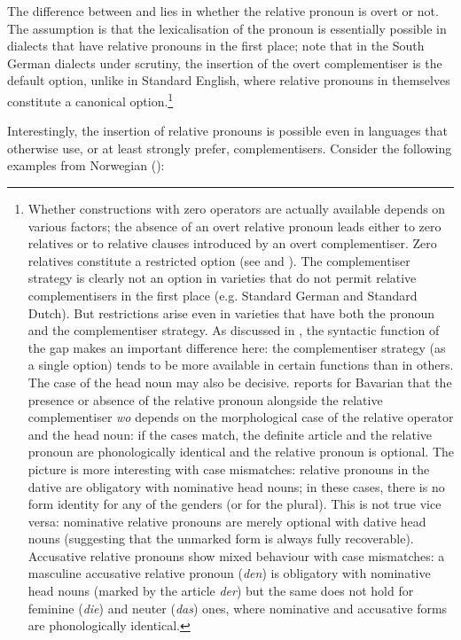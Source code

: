 The difference between  and  lies in whether the relative pronoun is overt or not. The assumption is that the lexicalisation of the pronoun is essentially possible in dialects that have relative pronouns in the first place; note that in the South German dialects under scrutiny, the insertion of the overt complementiser is the default option, unlike in Standard English, where relative pronouns in themselves constitute a canonical option.\footnote{Whether constructions with zero operators are actually available depends on various factors; the absence of an overt relative pronoun leads either to zero relatives or to relative clauses introduced by an overt complementiser. Zero relatives constitute a restricted option (see  and ). The complementiser strategy is clearly not an option in varieties that do not permit relative complementisers in the first place (e.g. Standard German and Standard Dutch). But restrictions arise even in varieties that have both the pronoun and the complementiser strategy. As discussed in , the syntactic function of the gap makes an important difference here: the complementiser strategy (as a single option) tends to be more available in certain functions than in others. The case of the head noun may also be decisive. \citet[215--217, 221--222]{bayer1984} reports for Bavarian that the presence or absence of the relative pronoun alongside the relative complementiser \textit{wo} depends on the morphological case of the relative operator and the head noun: if the cases match, the definite article and the relative pronoun are phonologically identical and the relative pronoun is optional. The picture is more interesting with case mismatches: relative pronouns in the dative are obligatory with nominative head nouns; in these cases, there is no form identity for any of the genders (or for the plural). This is not true vice versa: nominative relative pronouns are merely optional with dative head nouns (suggesting that the unmarked form is always fully recoverable). Accusative relative pronouns show mixed behaviour with case mismatches: a masculine accusative relative pronoun (\textit{den}) is obligatory with nominative head nouns (marked by the article \textit{der}) but the same does not hold for feminine (\textit{die}) and neuter (\textit{das}) ones, where nominative and accusative forms are phonologically identical.}

Interestingly, the insertion of relative pronouns is possible even in languages that otherwise use, or at least strongly prefer, complementisers. Consider the following examples from Norwegian (\citealt[185--187]{bacskaiatkaribaudisch2018}):

